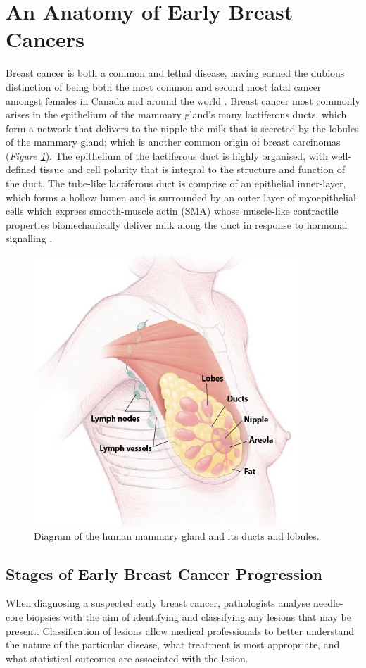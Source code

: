 \section{An Anatomy of Early Breast Cancers}
Breast cancer is both a common and lethal disease, having earned the dubious distinction of being both the most common and second most fatal cancer amongst females in Canada and around the world \citep{ccs2015}. Breast cancer most commonly arises in the epithelium of the mammary gland's many lactiferous ducts, which form a network that delivers to the nipple the milk that is secreted by the lobules of the mammary gland; which is another common origin of breast carcinomas (\emph{Figure \ref{anatomy}}). The epithelium of the lactiferous duct is highly organised, with well-defined tissue and cell polarity that is integral to the structure and function of the duct. The tube-like lactiferous duct is comprise of an epithelial inner-layer, which forms a hollow lumen and is surrounded by an outer layer of myoepithelial cells which express smooth-muscle actin (SMA) whose muscle-like contractile properties biomechanically deliver milk along the duct in response to hormonal signalling \citep{Hamperl_1970}.\par

\begin{figure}[ht!]
	\centering
	\includegraphics[width=100mm]{figures/breast_anatomy.jpg}
	\caption{Diagram of the human mammary gland and its ducts and lobules. \citep{NIH_2010} \label{anatomy}}
\end{figure}

\subsection{Stages of Early Breast Cancer Progression}
When diagnosing a suspected early breast cancer, pathologists analyse needle-core biopsies with the aim of identifying and classifying any lesions that may be present. Classification of lesions allow medical professionals to better understand the nature of the particular disease, what treatment is most appropriate, and what statistical outcomes are associated with the lesion.\par

